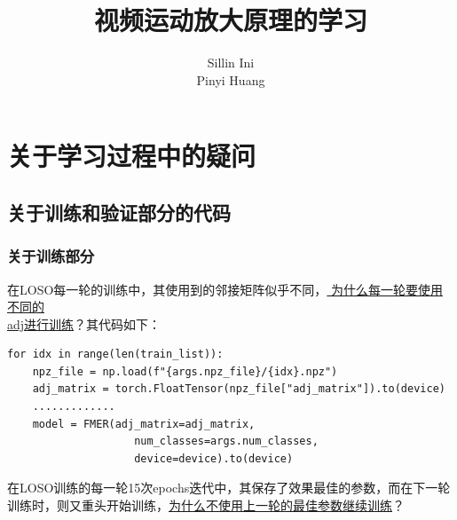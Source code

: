 \documentclass[AutoFakeBold]{MyFormat}
\begin{document}
%
%


\title{{视频运动放大原理的学习}}
\author{Sillin Ini\\Pinyi Huang}
\maketitle
\thispagestyle{empty}
\newpage

\tableofcontents
\thispagestyle{empty}
\newpage

\mainmatter




\setcounter{chapter}{0}

\chapter{关于学习过程中的疑问}


\section{关于训练和验证部分的代码}


\subsection{关于训练部分}
\par 在LOSO每一轮的训练中，其使用到的邻接矩阵似乎不同，\underline{{
为什么每一轮要使用不同的}}\\\underline{adj进行训练}？其代码如下：
\begin{lstlisting}
for idx in range(len(train_list)):
    npz_file = np.load(f"{args.npz_file}/{idx}.npz")
    adj_matrix = torch.FloatTensor(npz_file["adj_matrix"]).to(device)
    .............
    model = FMER(adj_matrix=adj_matrix,
                    num_classes=args.num_classes,
                    device=device).to(device)
\end{lstlisting}
\hspace*{\fill}
\par 在LOSO训练的每一轮15次epochs迭代中，其保存了效果最佳的参数，而在下一轮
训练时，则又重头开始训练，\underline{为什么不使用上一轮的最佳参数继续训练}？
\end{document}
